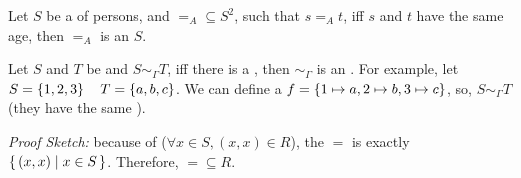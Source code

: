 Let $S$ be a  of persons, and $=_A \subseteq S^2$, such that $s =_A t$, iff $s$ and $t$ have the same age, then $=_A$ is an   $S$.

Let $S$ and $T$ be  and $S \sim_{\Gamma} T$, iff there is a  , then $\sim_{\Gamma}$ is an . For example, let $S = \left\{1,2,3\right\} \quad T = \left\{a,b,c\right\}$. We can define a  $f = \left\{1 \mapsto a, 2 \mapsto b, 3 \mapsto c\right\}$, so, $S \sim_{\Gamma} T$ (they have the same ).

\textit{Proof Sketch: }because of  ($\forall x \in S, (x,x) \in R$), the  $=$ is exactly $\{\,(x,x) \mid x \in S\,\}$. Therefore, $= \subseteq R$.